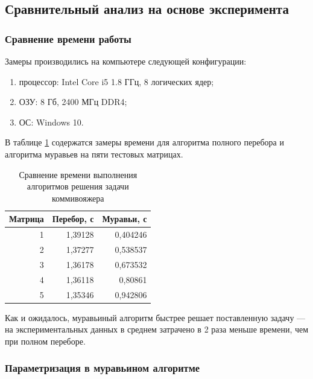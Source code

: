 \documentclass[a4paper,12pt]{article}
\begin{document}
\subsection{Сравнительный анализ на основе эксперимента}

\subsubsection{Сравнение времени работы}

Замеры производились на компьютере следующей конфигурации: 
\begin{enumerate}
\item[1)] процессор: Intel Core i5 1.8 ГГц, 8 логических ядер; 
\item[2)] ОЗУ: 8 Гб, 2400 МГц DDR4;
\item[3)] ОС: Windows 10.
\end{enumerate}

В таблице \ref{time1} содержатся замеры времени для алгоритма полного перебора и алгоритма муравьев на пяти тестовых матрицах.

\begin{table} [h!]
\begin{center}
\caption{Сравнение времени выполнения алгоритмов решения
задачи коммивояжера}
\begin{tabular}{|r|r|r|}
\hline
   Матрица & Перебор, с & Муравьи, с \\
   \hline
         1 &    1,39128 &   0,404246 \\
         \hline
         2 &    1,37277 &   0,538537 \\
         \hline
         3 &    1,36178 &   0,673532 \\
         \hline
         4 &    1,36118 &   0,80861 \\
         \hline
         5 &    1,35346 &   0,942806 \\
         \hline
\end{tabular} 
\label{time1}
\end{center}
\end{table} 

Как и ожидалось, муравьиный алгоритм быстрее
решает поставленную задачу --- на экспериментальных
данных в среднем затрачено в 2 раза
меньше времени, чем при полном переборе.

\subsubsection{Параметризация в муравьином алгоритме}
\end{document}
